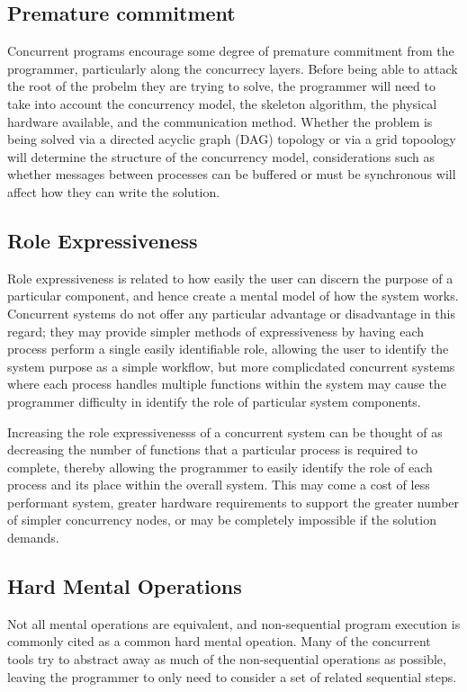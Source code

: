 \documentclass{sig-alternate}
\begin{document}
\subsection{Premature commitment}
Concurrent programs encourage some degree of premature commitment from the programmer, particularly along the concurrecy layers. Before being able to attack the root of the probelm they are trying to solve, the programmer will need to take into account the concurrency model, the skeleton algorithm, the physical hardware available, and the communication method. Whether the problem is being solved via a directed acyclic graph (DAG) topology or via a grid topoology will determine the structure of the concurrency model, considerations such as whether messages between processes can be buffered or must be synchronous will affect how they can write the solution.

\subsection{Role Expressiveness}
Role expressiveness is related to how easily the user can discern the purpose of a particular component, and hence create a mental model of how the system works. Concurrent systems do not offer any particular advantage or disadvantage in this regard; they may provide simpler methods of expressiveness by having each process perform a single easily identifiable role, allowing the user to identify the system purpose as a simple workflow, but more complicdated concurrent systems where each process handles multiple functions within the system may cause the programmer difficulty in identify the role of particular system components. 

Increasing the role expressivenesss of a concurrent system can be thought of as decreasing the number of functions that a particular process is required to complete, thereby allowing the programmer to easily identify the role of each process and its place within the overall system. This may come a cost of less performant system, greater hardware requirements to support the greater number of simpler concurrency nodes, or may be completely impossible if the solution demands. 

\subsection{Hard Mental Operations}
Not all mental operations are equivalent, and non-sequential program execution is commonly cited as a common hard mental opeation. Many of the concurrent tools try to abstract away as much of the non-sequential operations as possible, leaving the programmer to only need to consider a set of related sequential steps. 
\end{document}
